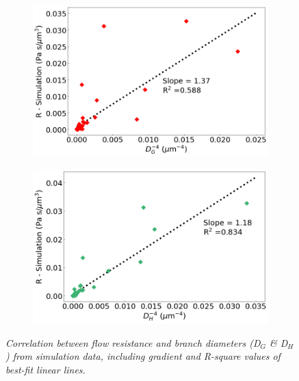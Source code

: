 \begin{figure}[H]
\centering
\begin{subfigure}{0.48 \textwidth}
    \includegraphics[width=1\textwidth]{images/PoiseuilleR_DG.png}
    \caption{\textit{} \label{PoiseuilleR_DG}}
\end{subfigure}
\hfill
\begin{subfigure}{0.48 \textwidth}
    \includegraphics[width=1\textwidth]{images/PoiseuilleR_DH.png}
    \caption{\textit{} \label{PoiseuilleR_DH}}
\end{subfigure}
\caption{\textit{Correlation between flow resistance and branch diameters (D$_{G}$ \& D$_{H}$) from simulation data, including gradient and R-square values of best-fit linear lines.} \label{PoiseuilleRDs}}
\end{figure}

